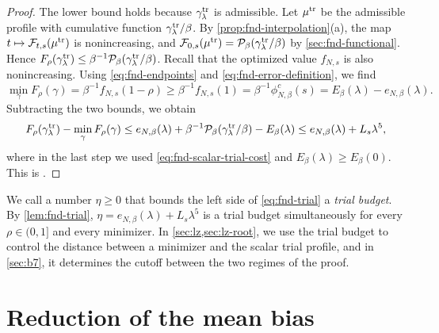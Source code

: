 \begin{proof}
The lower bound holds because $\gamma^{\rm tr}_\lambda$ is admissible.
Let $\mu^{\rm tr}$ be the admissible profile with cumulative function
$\gamma^{\rm tr}_\lambda/\beta$. By \cref{prop:fnd-interpolation}(a),
the map $t\mapsto\mathcal F_{t,s}(\mu^{\rm tr})$ is nonincreasing, and
$\mathcal F_{0,s}(\mu^{\rm tr})=\mathcal P_\beta(\gamma^{\rm tr}_\lambda/\beta)$
by \cref{sec:fnd-functional}. Hence
$F_\rho(\gamma^{\rm tr}_\lambda)\le
\beta^{-1}\mathcal P_\beta(\gamma^{\rm tr}_\lambda/\beta)$. Recall that
the optimized value $f_{N,s}$ is also nonincreasing. Using
\eqref{eq:fnd-endpoints} and \eqref{eq:fnd-error-definition}, we find
\[
 \min_\gamma F_\rho(\gamma)=\beta^{-1}f_{N,s}(1-\rho)
 \ge\beta^{-1}f_{N,s}(1)=\beta^{-1}\phi^c_{N,\beta}(s)
 =E_\beta(\lambda)-e_{N,\beta}(\lambda).
\]
Subtracting the two bounds, we obtain
\[
 F_\rho(\gamma^{\rm tr}_\lambda)-\min_\gamma F_\rho(\gamma)
 \le e_{N,\beta}(\lambda)
 +\beta^{-1}\mathcal P_\beta(\gamma^{\rm tr}_\lambda/\beta)-E_\beta(\lambda)
 \le e_{N,\beta}(\lambda)+L_s\lambda^5,
\]
where in the last step we used \eqref{eq:fnd-scalar-trial-cost} and
$E_\beta(\lambda)\ge E_\beta(0)$. This is
\cite[Proposition~7.7, (7.44)]{AL}.
\end{proof}

We call a number $\eta\ge0$ that bounds the left side of
\eqref{eq:fnd-trial} a \emph{trial budget}. By \cref{lem:fnd-trial},
$\eta=e_{N,\beta}(\lambda)+L_s\lambda^5$ is a trial budget
simultaneously for every $\rho\in(0,1]$ and every minimizer. In
\cref{sec:lz,sec:lz-root}, we use the trial budget to control the
distance between a minimizer and the scalar trial profile, and in
\cref{sec:b7}, it determines the cutoff between the two regimes of the proof.

\section{Reduction of the mean bias}\label{sec:fnd-mean-bias}

